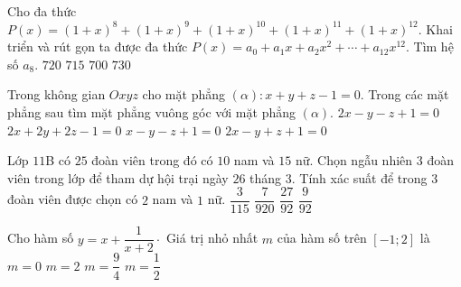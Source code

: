 \begin{ex}%
Cho đa thức $P(x)=(1+x)^8+(1+x)^9+(1+x)^{10}+(1+x)^{11}+(1+x)^{12}$. Khai triển và rút gọn ta được đa thức $P(x)=a_0+a_1x+a_2x^2+\cdots+a_{12}x^{12}$. Tìm hệ số $a_8$.
\choice
{$720$}
{\True $715$}
{$700$}
{$730$}
\end{ex}

\begin{ex}%
Trong không gian $Oxyz$ cho mặt phẳng $(\alpha)\colon x+y+z-1=0$. Trong các mặt phẳng sau tìm mặt phẳng vuông góc với mặt phẳng $(\alpha)$.
\choice
{\True $2x-y-z+1=0$}
{$2x+2y+2z-1=0$}
{$x-y-z+1=0$}
{$2x-y+z+1=0$}
\end{ex}

\begin{ex}%
Lớp $11$B có $25$ đoàn viên trong đó có $10$ nam và $15$ nữ. Chọn ngẫu nhiên $3$ đoàn viên trong lớp để tham dự hội trại ngày $26$ tháng $3$. Tính xác suất để trong $3$ đoàn viên được chọn có $2$ nam và $1$ nữ.
\choice
{$\dfrac{3}{115}$}
{$\dfrac{7}{920}$}
{\True $\dfrac{27}{92}$}
{$\dfrac{9}{92}$}
\end{ex}

\begin{ex}%
Cho hàm số $y=x+\dfrac{1}{x+2}\cdot$ Giá trị nhỏ nhất $m$ của hàm số trên $[-1;2]$ là
\choice
{\True $m=0$}
{$m=2$}
{$m=\dfrac{9}{4}$}
{$m=\dfrac{1}{2}$}
\end{ex}

